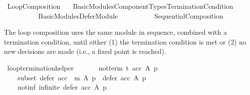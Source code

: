 %
\begin{isabellebody}%
%
%
\isadelimdocument
\isanewline
%
\endisadelimdocument
%
\isatagdocument
\isanewline
\isanewline
%
\isamarkuptrue%
%
\endisatagdocument
{\isafolddocument}%
%
\isadelimdocument
%
\endisadelimdocument
%
\isadelimtheory
%
\endisadelimtheory
%
\isatagtheory
{}\isamarkupfalse%
\ Loop{\isacharunderscore}{\kern0pt}Composition\isanewline
\ \ \ {\isachardoublequoteopen}Basic{\isacharunderscore}{\kern0pt}Modules{\isacharslash}{\kern0pt}Component{\isacharunderscore}{\kern0pt}Types{\isacharslash}{\kern0pt}Termination{\isacharunderscore}{\kern0pt}Condition{\isachardoublequoteclose}\isanewline
\ \ \ \ \ \ \ \ \ \ {\isachardoublequoteopen}Basic{\isacharunderscore}{\kern0pt}Modules{\isacharslash}{\kern0pt}Defer{\isacharunderscore}{\kern0pt}Module{\isachardoublequoteclose}\isanewline
\ \ \ \ \ \ \ \ \ \ Sequential{\isacharunderscore}{\kern0pt}Composition\isanewline
{}%
\endisatagtheory
{\isafoldtheory}%
%
\isadelimtheory
%
\endisadelimtheory
%
\begin{isamarkuptext}%
The loop composition uses the same module in sequence,
combined with a termination condition, until either
  (1) the termination condition is met or
  (2) no new decisions are made (i.e., a fixed point is reached).%
\end{isamarkuptext}\isamarkuptrue%
%
\isadelimdocument
%
\endisadelimdocument
%
\isatagdocument
%
\isamarkuptrue%
%
\endisatagdocument
{\isafolddocument}%
%
\isadelimdocument
%
\endisadelimdocument
{}\isamarkupfalse%
\ loop{\isacharunderscore}{\kern0pt}termination{\isacharunderscore}{\kern0pt}helper{\isacharcolon}{\kern0pt}\isanewline
\ \ \isanewline
\ \ \ \ not{\isacharunderscore}{\kern0pt}term{\isacharcolon}{\kern0pt}\ {\isachardoublequoteopen}{\isasymnot}t\ {\isacharparenleft}{\kern0pt}acc\ A\ p{\isacharparenright}{\kern0pt}{\isachardoublequoteclose}\ \isanewline
\ \ \ \ subset{\isacharcolon}{\kern0pt}\ {\isachardoublequoteopen}defer\ {\isacharparenleft}{\kern0pt}acc\ {\isasymtriangleright}\ m{\isacharparenright}{\kern0pt}\ A\ p\ {\isasymsubset}\ defer\ acc\ A\ p{\isachardoublequoteclose}\ \isanewline
\ \ \ \ not{\isacharunderscore}{\kern0pt}inf{\isacharcolon}{\kern0pt}\ {\isachardoublequoteopen}{\isasymnot}infinite\ {\isacharparenleft}{\kern0pt}defer\ acc\ A\ p{\isacharparenright}{\kern0pt}{\isachardoublequoteclose}\isanewline

\end{isabellebody}
